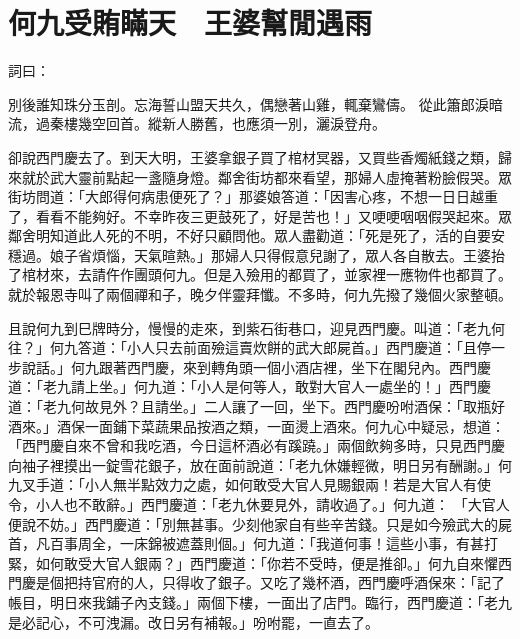 %

\chapter{何九受賄瞞天　王婆幫閒遇雨}

\begin{showcontents}{}


詞曰：

別後誰知珠分玉剖。忘海誓山盟天共久，偶戀著山雞，輒棄鸞儔。
從此簫郎淚暗流，過秦樓幾空回首。縱新人勝舊，也應須一別，灑淚登舟。

卻說西門慶去了。到天大明，王婆拿銀子買了棺材冥器，又買些香燭紙錢之類，歸來就於武大靈前點起一盞隨身燈。鄰舍街坊都來看望，那婦人虛掩著粉臉假哭。眾街坊問道：「大郎得何病患便死了？」那婆娘答道：「因害心疼，不想一日日越重了，看看不能夠好。不幸昨夜三更鼓死了，好是苦也！」又哽哽咽咽假哭起來。眾鄰舍明知道此人死的不明，不好只顧問他。眾人盡勸道：「死是死了，活的自要安穩過。娘子省煩惱，天氣暄熱。」那婦人只得假意兒謝了，眾人各自散去。王婆抬了棺材來，去請仵作團頭何九。但是入殮用的都買了，並家裡一應物件也都買了。就於報恩寺叫了兩個禪和子，晚夕伴靈拜懺。不多時，何九先撥了幾個火家整頓。

且說何九到巳牌時分，慢慢的走來，到紫石街巷口，迎見西門慶。叫道：「老九何往？」何九答道：「小人只去前面殮這賣炊餅的武大郎屍首。」西門慶道：「且停一步說話。」何九跟著西門慶，來到轉角頭一個小酒店裡，坐下在閣兒內。西門慶道：「老九請上坐。」何九道：「小人是何等人，敢對大官人一處坐的！」西門慶道：「老九何故見外？且請坐。」二人讓了一回，坐下。西門慶吩咐酒保：「取瓶好酒來。」酒保一面鋪下菜蔬果品按酒之類，一面燙上酒來。何九心中疑忌，想道：「西門慶自來不曾和我吃酒，今日這杯酒必有蹊蹺。」兩個飲夠多時，只見西門慶向袖子裡摸出一錠雪花銀子，放在面前說道：「老九休嫌輕微，明日另有酬謝。」何九叉手道：「小人無半點效力之處，如何敢受大官人見賜銀兩！若是大官人有使令，小人也不敢辭。」西門慶道：「老九休要見外，請收過了。」何九道： 「大官人便說不妨。」西門慶道：「別無甚事。少刻他家自有些辛苦錢。只是如今殮武大的屍首，凡百事周全，一床錦被遮蓋則個。」何九道：「我道何事！這些小事，有甚打緊，如何敢受大官人銀兩？」西門慶道：「你若不受時，便是推卻。」何九自來懼西門慶是個把持官府的人，只得收了銀子。又吃了幾杯酒，西門慶呼酒保來：「記了帳目，明日來我鋪子內支錢。」兩個下樓，一面出了店門。臨行，西門慶道：「老九是必記心，不可洩漏。改日另有補報。」吩咐罷，一直去了。


\end{showcontents}
